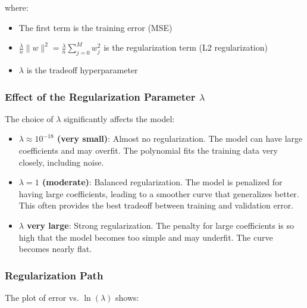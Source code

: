 \documentclass[11pt,a4paper]{article}
\theoremstyle{definition}
\theoremstyle{plain}
\theoremstyle{remark}
\begin{document}
where:
\begin{itemize}
    \item The first term is the training error (MSE)
    \item $\frac{\lambda}{n} \|w\|^2 = \frac{\lambda}{n} \sum_{j=0}^{M} w_j^2$ is the regularization term (L2 regularization)
    \item $\lambda$ is the tradeoff hyperparameter
\end{itemize}

\subsubsection{Effect of the Regularization Parameter $\lambda$}

The choice of $\lambda$ significantly affects the model:

\begin{itemize}
    \item \textbf{$\lambda \approx 10^{-18}$ (very small)}: Almost no regularization. The model can have large coefficients and may overfit. The polynomial fits the training data very closely, including noise.
    
    \item \textbf{$\lambda = 1$ (moderate)}: Balanced regularization. The model is penalized for having large coefficients, leading to a smoother curve that generalizes better. This often provides the best tradeoff between training and validation error.
    
    \item \textbf{$\lambda$ very large}: Strong regularization. The penalty for large coefficients is so high that the model becomes too simple and may underfit. The curve becomes nearly flat.
\end{itemize}

\subsubsection{Regularization Path}

The plot of error vs. $\ln(\lambda)$ shows:
\end{document}
